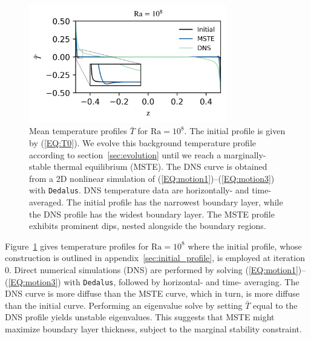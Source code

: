 \documentclass[reprint,amsmath,amssymb,aps]{revtex4-1}
\newcommand\Ra{\mathrm{Ra}}
\newcommand{\eq}[1]{(\ref{#1})}
\newcommand{\eqss}[2]{(\ref{#1})--(\ref{#2})}
\begin{document}
\begin{figure}
    \centering
    \includegraphics[width=3.4in]{T_profs_na.png}
    \caption{Mean temperature profiles $\bar{T}$ for $\Ra = 10^8$. 
    The initial profile is given by \eq{EQ:T0}. 
    We evolve this background temperature profile according to section~\ref{sec:evolution} until we reach a marginally-stable thermal equilibrium (MSTE).
    The DNS curve is obtained from a 2D nonlinear simulation of \eqss{EQ:motion1}{EQ:motion3} with \texttt{Dedalus}.
    DNS temperature data are horizontally- and time-averaged.
    The initial profile has the narrowest boundary layer, while the DNS profile has the widest boundary layer.
    The MSTE profile exhibits prominent dips, nested alongside the boundary regions. }
    \label{fig:T0_profiles}
\end{figure}

Figure~\ref{fig:T0_profiles} gives temperature profiles for $\Ra = 10^8$ where the initial profile, whose construction is outlined in appendix~\ref{sec:initial_profile}, is employed at iteration 0. 
Direct numerical simulations (DNS) are performed by solving \eqss{EQ:motion1}{EQ:motion3} with \texttt{Dedalus}, followed by horizontal- and time- averaging. 
The DNS curve is more diffuse than the MSTE curve, which in turn, is more diffuse than the initial curve. 
Performing an eigenvalue solve by setting $\bar{T}$ equal to the DNS profile yields unstable eigenvalues. 
This suggests that MSTE might maximize boundary layer thickness, subject to the marginal stability constraint.
\end{document}

